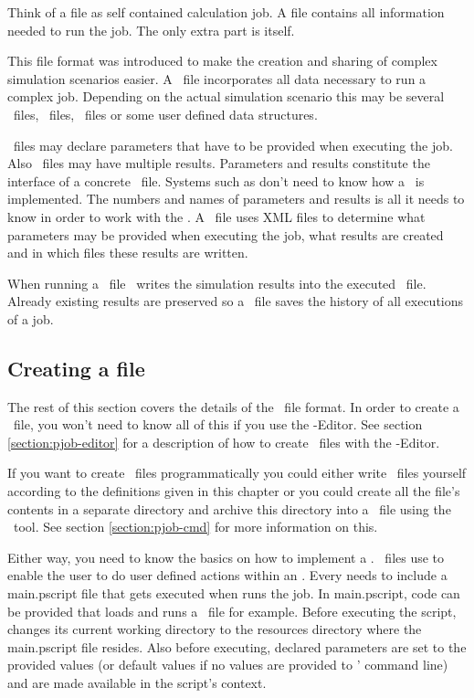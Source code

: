Think of a \PJOB{} file as self contained \PHO{} calculation job.
A \PJOB{} file contains all information needed to run the job.
The only extra part is \PHO{} itself.\bb

This file format was introduced to make the creation and sharing of complex simulation scenarios easier.
A \pjob\ file incorporates all data necessary to run a complex job.
Depending on the actual simulation scenario this may be several \pho\ files, \matlab\ files, \pscript\ files
or some user defined data structures.\bb

\pjob\ files may declare parameters that have to be provided when executing the job.
Also \pjob\ files may have multiple results.
Parameters and results constitute the interface of a concrete \pjob\ file.
Systems such as \PQUEUE{} don't need to know how a \pjob\ is implemented.
The numbers and names of parameters and results is all it needs to know
in order to work with the \pjob{}. 
A \pjob\ file uses XML files to determine what parameters may be provided when executing the job,
what results are created and in which files these results are written. \bb

When running a \pjob\ file \photoss\ writes the simulation results into the executed \pjob\ file.
Already existing results are preserved so a \pjob\ file saves the history of all executions of a job.\bb






\subsection{Creating a \PJOB{} file}
The rest of this section covers the details of the \pjob\ file format.
In order to create a \pjob\ file, you won't need to know all of this if you use the \PJOB-Editor.
See section \ref{section:pjob-editor} for a description of how to create \pjob\ files with the \PJOB-Editor.\bb

If you want to create \pjob\ files programmatically you could either write \pjob\ files yourself
according to the definitions given in this chapter
or you could create all the \pjob file's contents in a separate directory and archive this directory
into a \pjob\ file using the \PJOBCMD\ tool.
See section \ref{section:pjob-cmd} for more information on this.\bb

Either way, you need to know the basics on how to implement a \pjob.
\pjob\ files use \PS{} to enable the user to do user defined actions within an \PJOB{}.
Every \PJOB{} needs to include a main.pscript file that gets executed when \PHO{} runs the job.
In main.pscript, code can be provided that loads and runs a \pho\ file for example.
Before executing the script, \PHO{} changes its current working directory to the resources directory
where the main.pscript file resides.
Also before executing, declared parameters are set to the provided values
(or default values if no values are provided to \PHO{}' command line)
and are made available in the script's context.

